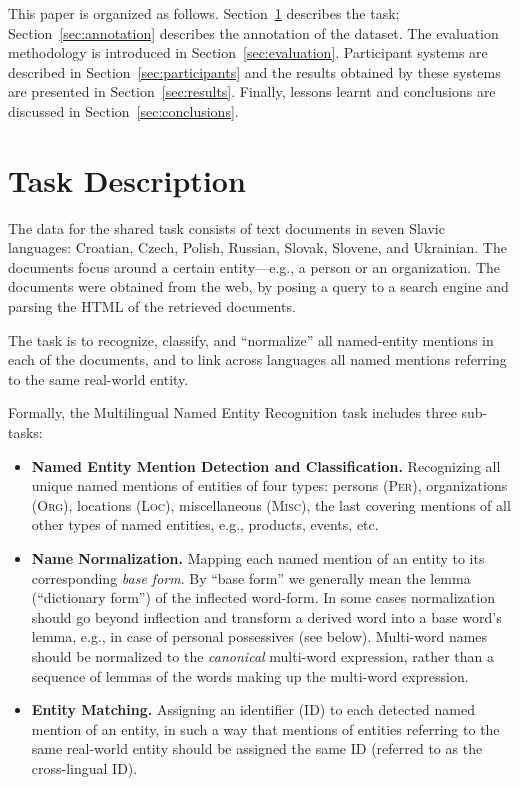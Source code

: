 \documentclass[11pt]{article}
\begin{document}
This paper is organized as follows.  Section~\ref{sec:task} describes the task;
Section~\ref{sec:annotation} describes the annotation of the dataset.  The evaluation
methodology is introduced in Section~\ref{sec:evaluation}.  Participant systems are described
in Section~\ref{sec:participants} and the results obtained by these systems are presented in
Section~\ref{sec:results}.  Finally, lessons learnt and conclusions are discussed in
Section~\ref{sec:conclusions}.

\section{Task Description}
\label{sec:task}


The data for the shared task consists of text documents {in seven Slavic languages: Croatian,
  Czech, Polish, Russian, Slovak, Slovene, and Ukrainian. The documents focus around a certain
  entity---e.g., a person or an organization. The documents were obtained from the web, by
  posing a query to a search engine and parsing the HTML of the retrieved documents.}

The task {is} to recognize, classify, and ``normalize'' all named-entity mentions in each of
the documents, and to link across languages all named mentions referring to the same
real-world entity.

Formally, the Multilingual Named Entity Recognition task includes three
sub-tasks:

\begin{itemize}

\item \textbf{Named Entity Mention Detection and Classification.}
  Recognizing all unique named mentions of entities of four types:
  persons (\textsc{Per}), organizations (\textsc{Org}), locations (\textsc{Loc}), miscellaneous
  (\textsc{Misc}), the last covering mentions of all other types of named
  entities, e.g., products, events, etc.

\item \textbf{Name Normalization.} {Mapping each named mention of an entity to its
    corresponding {\em base form}.  By ``base form'' we generally mean the lemma (``dictionary
    form'') of the inflected word-form.  In some cases normalization should go beyond
    inflection and transform a derived word into a base word's lemma, e.g., in case of
    personal possessives (see below).  Multi-word names should be normalized to the {\em
      canonical} multi-word expression, rather than a sequence of lemmas of the words making
    up the multi-word expression.}

\item \textbf{Entity Matching.} Assigning an identifier (ID) to each detected named mention of
  an entity, in such a way that mentions of entities referring to the same real-world entity
  should be assigned the same ID (referred to as the cross-lingual ID).

\end{itemize}
\end{document}
